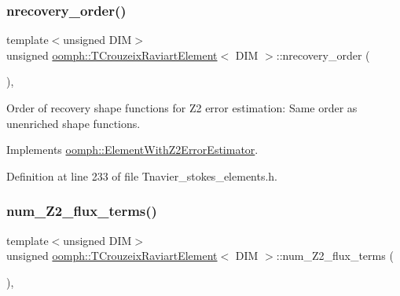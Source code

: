 \subsubsection{\texorpdfstring{nrecovery\+\_\+order()}{nrecovery\_order()}}
{\footnotesize\ttfamily template$<$unsigned D\+IM$>$ \\
unsigned \hyperlink{classoomph_1_1TCrouzeixRaviartElement}{oomph\+::\+T\+Crouzeix\+Raviart\+Element}$<$ D\+IM $>$\+::nrecovery\+\_\+order (\begin{DoxyParamCaption}{ }\end{DoxyParamCaption})\hspace{0.3cm}{\ttfamily [inline]}, {\ttfamily [virtual]}}



Order of recovery shape functions for Z2 error estimation\+: Same order as unenriched shape functions. 



Implements \hyperlink{classoomph_1_1ElementWithZ2ErrorEstimator_af39480835bd3e0f6b2f4f7a9a4044798}{oomph\+::\+Element\+With\+Z2\+Error\+Estimator}.



Definition at line 233 of file Tnavier\+\_\+stokes\+\_\+elements.\+h.

\mbox{\label{classoomph_1_1TCrouzeixRaviartElement_af770b1f3d012a9b470375d7d98f3407b}} 
\subsubsection{\texorpdfstring{num\+\_\+\+Z2\+\_\+flux\+\_\+terms()}{num\_Z2\_flux\_terms()}}
{\footnotesize\ttfamily template$<$unsigned D\+IM$>$ \\
unsigned \hyperlink{classoomph_1_1TCrouzeixRaviartElement}{oomph\+::\+T\+Crouzeix\+Raviart\+Element}$<$ D\+IM $>$\+::num\+\_\+\+Z2\+\_\+flux\+\_\+terms (\begin{DoxyParamCaption}{ }\end{DoxyParamCaption})\hspace{0.3cm}{\ttfamily [inline]}, {\ttfamily [virtual]}}



